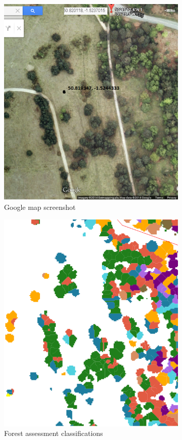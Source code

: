 \documentclass{subfiles}
\begin{document}
	   \begin{figure} [h!]
	   	\begin{subfigure}[t]{.5\textwidth}
	   		\centering
	   		\includegraphics[width=.9\textwidth]{img/NewForest/Area1GoogleMap}
	   		\caption{Google map screenshot}
	   		\label{fig:Area1GoogleMap}
	   	\end{subfigure} \hfill
	   	\begin{subfigure}[t]{.5\textwidth}
	   		\centering
	   		\includegraphics[width=.9\textwidth]{img/NewForest/Area1Classifications}
	   		\caption{Forest assessment classifications} 
	   		\label{fig:Area1Classifications}
	   	\end{subfigure}
	   	\begin{subfigure}[t]{.5\textwidth}
	   		

\end{subfigure}
\end{figure}
\end{document}
